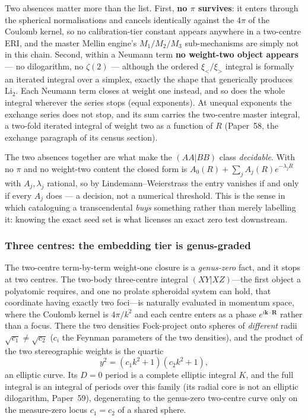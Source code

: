 \documentclass[aps,pra,twocolumn,superscriptaddress,longbibliography]{revtex4-2}
\begin{document}
Two absences matter more than the list.  First, \textbf{no $\pi$
survives}: it enters through the spherical normalisations and cancels
identically against the $4\pi$ of the Coulomb kernel, so no
calibration-tier constant appears anywhere in a two-centre ERI, and
the master Mellin engine's $M_1/M_2/M_3$ sub-mechanisms are simply not
in this chain.  Second, within a Neumann term \textbf{no weight-two object appears} --- no
dilogarithm, no $\zeta(2)$ --- although the ordered $\xi_< / \xi_>$
integral is formally an iterated integral over a simplex, exactly the
shape that generically produces $\mathrm{Li}_2$.  Each Neumann term
closes at weight one instead, and so does the whole integral wherever the
series stops (equal exponents).  At unequal exponents the exchange series
does not stop, and its sum carries the two-centre master integral, a two-fold
iterated integral of weight two as a function of $R$ (Paper~58, the exchange
paragraph of its census section).

The two absences together are what make the $(AA|BB)$ class
\emph{decidable}.  With no $\pi$ and no weight-two content the closed
form is $A_0(R) + \sum_j A_j(R)e^{-\lambda_j R}$ with $A_j, \lambda_j$
rational, so by Lindemann--Weierstrass the entry vanishes if and only
if every $A_j$ does --- a decision, not a numerical threshold.  This is
the sense in which cataloguing a transcendental \emph{buys} something
rather than merely labelling it: knowing the exact seed set is what
licenses an exact zero test downstream.

\subsubsection{Three centres: the embedding tier is genus-graded}
\label{sec:level2_genus}

The two-centre term-by-term weight-one closure is a \emph{genus-zero} fact, and it stops at
two centres.  The two-body three-centre integral $(XY|XZ)$---the first object a
polyatomic requires, and one no prolate spheroidal system can hold, that
coordinate having exactly two foci---is naturally evaluated in momentum space,
where the Coulomb kernel is $4\pi/k^2$ and each centre enters as a phase
$e^{i\mathbf{k}\cdot\mathbf{R}}$ rather than a focus.  There the two densities
Fock-project onto spheres of \emph{different} radii $\sqrt{c_1}\neq\sqrt{c_2}$
($c_i$ the Feynman parameters of the two densities), and the product of the two
stereographic weights is the quartic
\begin{equation}
  y^2 = (c_1 k^2 + 1)(c_2 k^2 + 1),
\end{equation}
an elliptic curve.  Its $D=0$ period is a complete elliptic integral $K$, and
the full integral is an integral of periods over this family (its radial core is not an elliptic dilogarithm, Paper~59), degenerating to
the genus-zero two-centre curve only on the measure-zero locus $c_1 = c_2$ of a
shared sphere.
\end{document}
